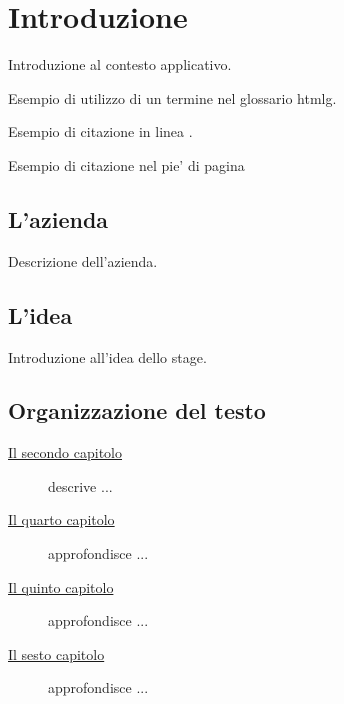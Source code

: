 \chapter{Introduzione}
\label{cap:introduzione}

\par Introduzione al contesto applicativo.

\par\noindent Esempio di utilizzo di un termine nel glossario
\gls{htmlg}.

\par\noindent Esempio di citazione in linea
\cite{site:semver}.

\par\noindent Esempio di citazione nel pie' di pagina 

\section{L'azienda}

\par Descrizione dell'azienda.

\section{L'idea}

\par Introduzione all'idea dello stage.

\section{Organizzazione del testo}

\begin{description}
    \item[{\hyperref[cap:descrizione-progetto]{Il secondo capitolo}}] descrive ...
    
    
    \item[{\hyperref[cap:analisi-requisiti]{Il quarto capitolo}}] approfondisce ...
    
    \item[{\hyperref[cap:progettazione-codifica]{Il quinto capitolo}}] approfondisce ...
    
    \item[{\hyperref[cap:verifica-validazione]{Il sesto capitolo}}] approfondisce ...
    
\end{description}

